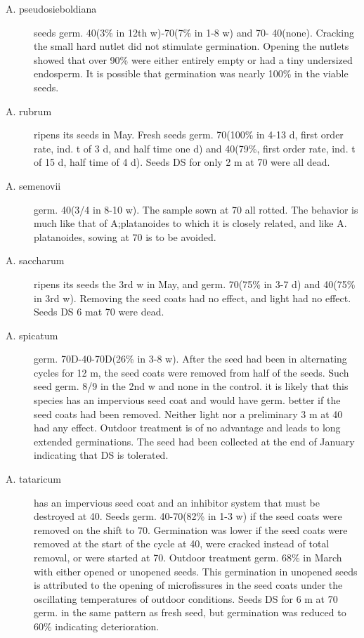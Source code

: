 \begin{description}
\item[A. pseudosieboldiana] seeds germ. 40(3\% in 12th w)-70(7\% in 1-8 w) and 70-
40(none). Cracking the small hard nutlet did not stimulate germination. Opening the
nutlets showed that over 90\% were either entirely empty or had a tiny undersized
endosperm. It is possible that germination was nearly 100\% in the viable seeds.

\item[A. rubrum] ripens its seeds in May. Fresh seeds germ. 70(100\% in 4-13 d, first
order rate, ind. t of 3 d, and half time one d) and 40(79\%, first order rate, ind. t of 15 d,
half time of 4 d). Seeds DS for only 2 m at 70 were all dead.

\item[A. semenovii] germ. 40(3/4 in 8-10 w). The sample sown at 70 all rotted. The
behavior is much like that of A;platanoides to which it is closely related, and like A.
platanoides, sowing at 70 is to be avoided.

\item[A. saccharum] ripens its seeds the 3rd w in May, and germ. 70(75\% in 3-7 d)
and 40(75\% in 3rd w). Removing the seed coats had no effect, and light had no effect.
Seeds DS 6 mat 70 were dead.

\item[A. spicatum] germ. 70D-40-70D(26\% in 3-8 w). After the seed had been in
alternating cycles for 12 m, the seed coats were removed from half of the seeds. Such
seed germ. 8/9 in the 2nd w and none in the control. it is likely that this species has an
impervious seed coat and would have germ. better if the seed coats had been
removed. Neither light nor a preliminary 3 m at 40 had any effect. Outdoor treatment
is of no advantage and leads to long extended germinations. The seed had been
collected at the end of January indicating that DS is tolerated.

\item[A. tataricum] has an impervious seed coat and an inhibitor system that must be
destroyed at 40. Seeds germ. 40-70(82\% in 1-3 w) if the seed coats were removed on
the shift to 70. Germination was lower if the seed coats were removed at the start of
the cycle at 40, were cracked instead of total removal, or were started at 70. Outdoor
treatment germ. 68\% in March with either opened or unopened seeds. This
germination in unopened seeds is attributed to the opening of microfissures in the
seed coats under the oscillating temperatures of outdoor conditions. Seeds DS for 6 m
at 70 germ. in the same pattern as fresh seed, but germination was reduced to 60\%
indicating deterioration.


\end{description}
